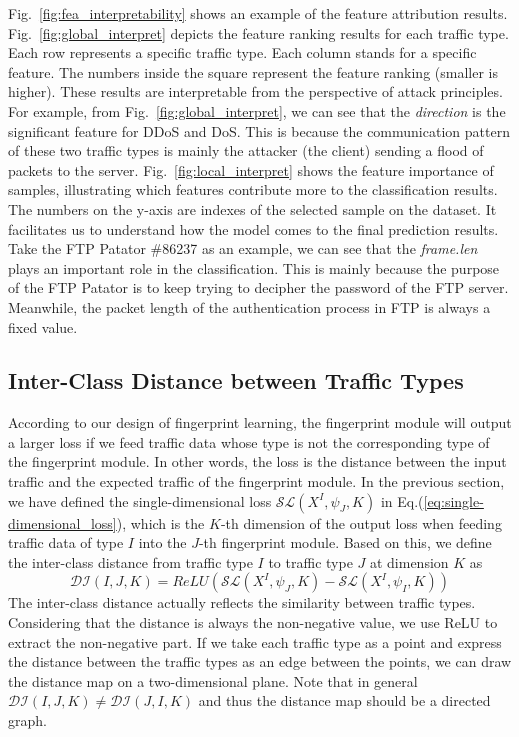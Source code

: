 Fig.~\ref{fig:fea_interpretability} shows an example of the feature attribution results. 
Fig.~\ref{fig:global_interpret} depicts the feature ranking results for each traffic type.
Each row represents a specific traffic type.
Each column stands for a specific feature.
The numbers inside the square represent the feature ranking (smaller is higher).
These results are interpretable from the perspective of attack principles.
For example, from Fig.~\ref{fig:global_interpret}, we can see that the \emph{direction} is the significant feature for DDoS and DoS.
This is because the communication pattern of these two traffic types is mainly the attacker (the client) sending a flood of packets to the server.
Fig.~\ref{fig:local_interpret} shows the feature importance of samples, illustrating which features contribute more to the classification results.
The numbers on the y-axis are indexes of the selected sample on the dataset. 
It facilitates us to understand how the model comes to the final prediction results.
Take the FTP Patator \#86237 as an example,  we can see that the \emph{frame.len} plays an important role in the classification.
This is mainly because the purpose of the FTP Patator is to keep trying to decipher the password of the FTP server.
Meanwhile, the packet length of the authentication process in FTP is always a fixed value. 

\subsection{Inter-Class Distance between Traffic Types}
\label{sec:inter_class_distance}
According to our design of fingerprint learning, the fingerprint module will output a larger loss if we feed traffic data whose type is not the corresponding type of the fingerprint module.
In other words, the loss is the distance between the input traffic and the expected traffic of the fingerprint module.
In the previous section, we have defined the single-dimensional loss $\mathcal{SL}(X^I,  \psi_J,  K)$ in Eq.(\ref{eq:single-dimensional_loss}), which is the $K$-th dimension of the output loss when feeding traffic data of type $I$ into the $J$-th fingerprint module. 
Based on this, we define the inter-class distance from traffic type $I$ to traffic type $J$ at dimension $K$ as
\begin{equation}\label{equ:traffic_distance}
    \mathcal{DI}(I, J, K) = ReLU(\mathcal{SL}(X^I,  \psi_J,  K) - \mathcal{SL}(X^I,  \psi_I,  K))
\end{equation}
The inter-class distance actually reflects the similarity between traffic types. 
Considering that the distance is always the non-negative value, we use ReLU to extract the non-negative part.
If we take each traffic type as a point and express the distance between the traffic types as an edge between the points, we can draw the distance map on a two-dimensional plane.
Note that in general $\mathcal{DI}(I, J, K) \neq \mathcal{DI}(J, I, K)$ and thus the distance map should be a directed graph. 

